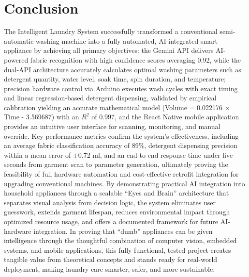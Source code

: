 \chapter*{Conclusion}

The Intelligent Laundry System successfully transformed a conventional semi-automatic washing machine into a fully automated, AI-integrated smart appliance by achieving all primary objectives: the Gemini API delivers AI-powered fabric recognition with high confidence scores averaging 0.92, while the dual-API architecture accurately calculates optimal washing parameters such as detergent quantity, water level, soak time, spin duration, and temperature; precision hardware control via Arduino executes wash cycles with exact timing and linear regression-based detergent dispensing, validated by empirical calibration yielding an accurate mathematical model (Volume = 0.022176 $\times$ Time - 3.569687) with an $R^2$ of 0.997, and the React Native mobile application provides an intuitive user interface for scanning, monitoring, and manual override. Key performance metrics confirm the system's effectiveness, including an average fabric classification accuracy of 89\%, detergent dispensing precision within a mean error of $\pm$0.72 ml, and an end-to-end response time under five seconds from garment scan to parameter generation, ultimately proving the feasibility of full hardware automation and cost-effective retrofit integration for upgrading conventional machines. By demonstrating practical AI integration into household appliances through a scalable ``Eyes and Brain'' architecture that separates visual analysis from decision logic, the system eliminates user guesswork, extends garment lifespan, reduces environmental impact through optimized resource usage, and offers a documented framework for future AI-hardware integration. In proving that ``dumb'' appliances can be given intelligence through the thoughtful combination of computer vision, embedded systems, and mobile applications, this fully functional, tested project creates tangible value from theoretical concepts and stands ready for real-world deployment, making laundry care smarter, safer, and more sustainable.